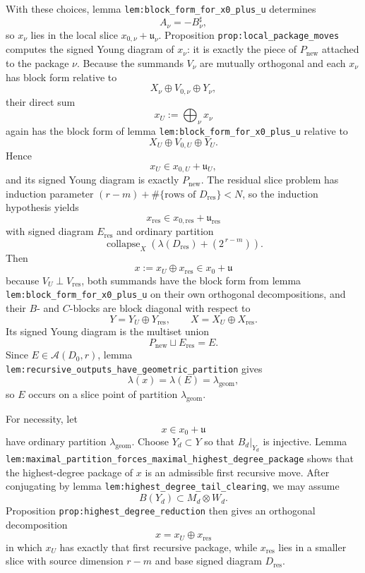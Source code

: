 \documentclass[
]{article}
\begin{document}
With these choices, lemma \texttt{lem:block\_form\_for\_x0\_plus\_u}
determines \[
A_{\nu}=-B_{\nu}^{\sharp},
\] so \(x_{\nu}\) lies in the local slice
\(x_{0,\nu}+\mathfrak u_{\nu}\). Proposition
\texttt{prop:local\_package\_moves} computes the signed Young diagram of
\(x_{\nu}\): it is exactly the piece of \(P_{\mathrm{new}}\) attached to
the package \(\nu\). Because the summands \(V_{\nu}\) are mutually
orthogonal and each \(x_{\nu}\) has block form relative to \[
X_{\nu}\oplus V_{0,\nu}\oplus Y_{\nu},
\] their direct sum \[
x_U:=\bigoplus_{\nu} x_{\nu}
\] again has the block form of lemma
\texttt{lem:block\_form\_for\_x0\_plus\_u} relative to \[
X_U\oplus V_{0,U}\oplus Y_U.
\] Hence \[
x_U\in x_{0,U}+\mathfrak u_U,
\] and its signed Young diagram is exactly \(P_{\mathrm{new}}\). The
residual slice problem has induction parameter
\((r-m)+\#\{\text{rows of }D_{\mathrm{res}}\}<N\), so the induction
hypothesis yields \[
x_{\mathrm{res}}\in x_{0,\mathrm{res}}+\mathfrak u_{\mathrm{res}}
\] with signed diagram \(E_{\mathrm{res}}\) and ordinary partition \[
\operatorname{collapse}_X(\lambda(D_{\mathrm{res}})+(2^{\,r-m})).
\] Then \[
x:=x_U\oplus x_{\mathrm{res}}\in x_0+\mathfrak u
\] because \(V_U\perp V_{\mathrm{res}}\), both summands have the block
form from lemma \texttt{lem:block\_form\_for\_x0\_plus\_u} on their own
orthogonal decompositions, and their \(B\)- and \(C\)-blocks are block
diagonal with respect to \[
Y=Y_U\oplus Y_{\mathrm{res}},
\qquad
X=X_U\oplus X_{\mathrm{res}}.
\] Its signed Young diagram is the multiset union \[
P_{\mathrm{new}}\sqcup E_{\mathrm{res}}=E.
\] Since \(E\in \mathcal A(D_0,r)\), lemma
\texttt{lem:recursive\_outputs\_have\_geometric\_partition} gives \[
\lambda(x)=\lambda(E)=\lambda_{\mathrm{geom}},
\] so \(E\) occurs on a slice point of partition
\(\lambda_{\mathrm{geom}}\).

For necessity, let \[
x\in x_0+\mathfrak u
\] have ordinary partition \(\lambda_{\mathrm{geom}}\). Choose
\(Y_d\subset Y\) so that \(B_d|_{Y_d}\) is injective. Lemma
\texttt{lem:maximal\_partition\_forces\_maximal\_highest\_degree\_package}
shows that the highest-degree package of \(x\) is an admissible first
recursive move. After conjugating by lemma
\texttt{lem:highest\_degree\_tail\_clearing}, we may assume \[
B(Y_d)\subset M_d\otimes W_d.
\] Proposition \texttt{prop:highest\_degree\_reduction} then gives an
orthogonal decomposition \[
x=x_U\oplus x_{\mathrm{res}}
\] in which \(x_U\) has exactly that first recursive package, while
\(x_{\mathrm{res}}\) lies in a smaller slice with source dimension
\(r-m\) and base signed diagram \(D_{\mathrm{res}}\).
\end{document}
